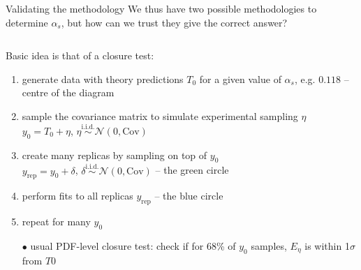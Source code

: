\documentclass[8pt,t]{beamer}
\begin{document}
\begin{frame}{Validating the methodology}
  We thus have two possible methodologies to determine $\alpha_s$, but how can we trust they give the correct answer?

  \vspace*{1em}
  \begin{columns}

    \begin{column}{0.49\textwidth}
      Basic idea is that of a closure test:
      \begin{enumerate}
        \item generate data with theory predictions $T_0$ for a given value of $\alpha_s$, e.g. $0.118$ -- centre of the diagram

        \item sample the covariance matrix to simulate experimental sampling $\eta$ \\
        $y_0 = T_0 + \eta$, \quad $\eta  \overset{\text{i.i.d.}}{\sim} \mathcal{N}(0,\mathrm{Cov})$

        \item create many replicas by sampling on top of $y_0$ \\
        $y_\mathrm{rep} = y_0 + \delta$, \quad $\delta  \overset{\text{i.i.d.}}{\sim} \mathcal{N}(0,\mathrm{Cov})$ -- the green circle

        \item perform fits to all replicas $y_\mathrm{rep}$ -- the blue circle

        \item repeat for many $y_0$

        \item[$\bullet$] usual PDF-level closure test: check if for 68\% of $y_0$ samples, $E_\eta$ is within 1$\sigma$ from $T0$


\end{enumerate}
\end{column}
\end{columns}
\end{frame}
\end{document}
